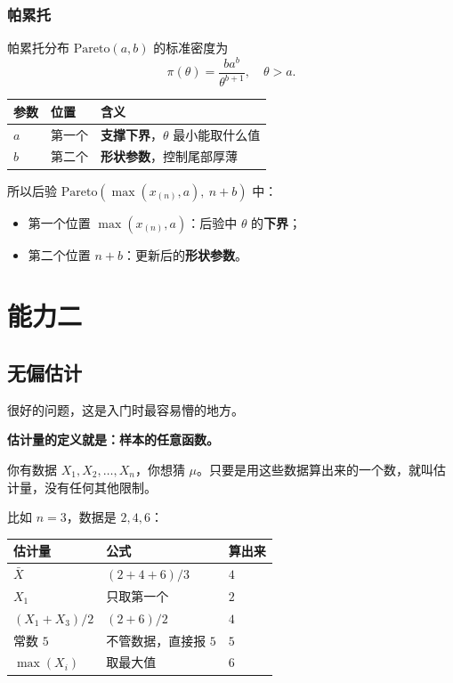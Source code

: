 \subsection{帕累托}
\begin{note}
帕累托分布 $\mathrm{Pareto}(a,b)$ 的标准密度为
\[
\pi(\theta)=\frac{ba^b}{\theta^{b+1}},\quad\theta>a.
\]

\begin{table}[h]
\centering
\renewcommand{\arraystretch}{1.5}
\begin{tabular}{lll}
\toprule
\textbf{参数} & \textbf{位置} & \textbf{含义} \\
\midrule
$a$ & 第一个 & \textbf{支撑下界}，$\theta$ 最小能取什么值 \\
$b$ & 第二个 & \textbf{形状参数}，控制尾部厚薄 \\
\bottomrule
\end{tabular}
\end{table}

所以后验 $\mathrm{Pareto}\!\left(\max(x_{(n)},a),\ n+b\right)$ 中：
\begin{itemize}
    \item 第一个位置 $\max(x_{(n)},a)$：后验中 $\theta$ 的\textbf{下界}；
    \item 第二个位置 $n+b$：更新后的\textbf{形状参数}。
\end{itemize}
\end{note}



\chapter{能力二}
\section{无偏估计}
很好的问题，这是入门时最容易懵的地方。

\textbf{估计量的定义就是：样本的任意函数。}

你有数据 $X_1, X_2, \ldots, X_n$，你想猜 $\mu$。只要是用这些数据算出来的一个数，就叫估计量，没有任何其他限制。

比如 $n=3$，数据是 $2, 4, 6$：

\begin{center}
\begin{tabular}{lll}
\hline
估计量 & 公式 & 算出来 \\
\hline
$\bar{X}$ & $(2+4+6)/3$ & $4$ \\
$X_1$ & 只取第一个 & $2$ \\
$(X_1+X_3)/2$ & $(2+6)/2$ & $4$ \\
常数 $5$ & 不管数据，直接报 $5$ & $5$ \\
$\max(X_i)$ & 取最大值 & $6$ \\
\hline
\end{tabular}
\end{center}

